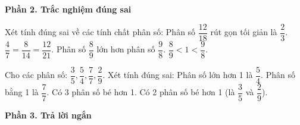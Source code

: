 \textbf{Phần 2. Trắc nghiệm đúng sai}

\begin{ex} %
Xét tính đúng sai về các tính chất phân số:
\choiceTF
{\True Phân số $\dfrac{12}{18}$ rút gọn tối giản là $\dfrac{2}{3}$.}
{\True $\dfrac{4}{7} = \dfrac{8}{14} = \dfrac{12}{21}$.}
{Phân số $\dfrac{8}{9}$ lớn hơn phân số $\dfrac{9}{8}$.}
{\True $\dfrac{8}{9} < 1 < \dfrac{9}{8}$.}
\end{ex}

\begin{ex} %
Cho các phân số: $\dfrac{3}{5}, \dfrac{5}{4}, \dfrac{7}{7}, \dfrac{2}{9}$. Xét tính đúng sai:
\choiceTF
{\True Phân số lớn hơn 1 là $\dfrac{5}{4}$.}
{\True Phân số bằng 1 là $\dfrac{7}{7}$.}
{Có 3 phân số bé hơn 1.}
{\True Có 2 phân số bé hơn 1 (là $\dfrac{3}{5}$ và $\dfrac{2}{9}$).}
\end{ex}

\textbf{Phần 3. Trả lời ngắn}

